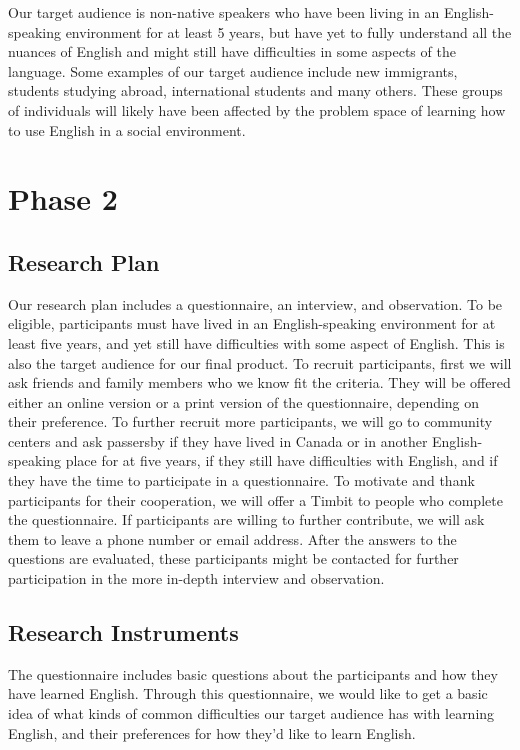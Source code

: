 \documentclass{sigchi}
\begin{document}
Our target audience is non-native speakers who have been living in an 
English-speaking environment for at least 5 years, but have yet to fully 
understand all the nuances of English and might still have difficulties in some 
aspects of the language. Some examples of our target audience include new 
immigrants, students studying abroad, international students and many others. 
These groups of individuals will likely have been affected by the problem space 
of learning how to use English in a social environment.

\section{Phase 2}
\subsection{Research Plan}

Our research plan includes a questionnaire, an interview, and observation. To be
eligible, participants must have lived in an English-speaking environment for at
least five years, and yet still have difficulties with some aspect of English. 
This is also the target audience for our final product. To recruit 
participants, first we will ask friends and family members who we know fit the 
criteria. They will be offered either an online version or a print version of 
the questionnaire, depending on their preference. To further recruit more 
participants, we will go to community centers and ask passersby if they have 
lived in Canada or in another English-speaking place for at five years, if they
still have difficulties with English, and if they have the time to participate
in a questionnaire. To motivate and thank participants for their cooperation, we
will offer a Timbit to people who complete the questionnaire. If participants 
are willing to further contribute, we will ask them to leave a phone number or 
email address. After the answers to the questions are evaluated, these 
participants might be contacted for further participation in the more in-depth 
interview and observation.

\subsection{Research Instruments}

The questionnaire includes basic questions about the participants and how they 
have learned English. Through this questionnaire, we would like to get a basic 
idea of what kinds of common difficulties our target audience has with learning 
English, and their preferences for how they’d like to learn English.
\end{document}

